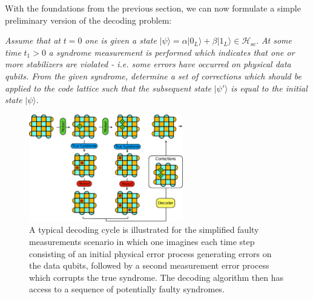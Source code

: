 \documentclass[twocolumn,preprintnumbers,amsmath,amssymb,notitlepage,nofootinbib,longbibliography,superscriptaddress,aps,pra,10pt]{revtex4-1}
\begin{document}
	With the foundations from the previous section, we can now formulate a simple preliminary version of the decoding problem: \newline

	\noindent\textit{Assume that at} $t=0$ \textit{one is given a state} $|\psi\rangle = \alpha |0_L\rangle + \beta |1_L\rangle \in \mathcal{H}_{\mathrm{sc}}.$
	\textit{At some time }$t_1>0$ \textit{a syndrome measurement is performed which indicates that one or more stabilizers are violated - i.e. some errors have occurred on physical data qubits.
	From the given syndrome, determine a set of corrections which should be applied to the code lattice such that the subsequent state} $|\psi'\rangle$
	\textit{is equal to the initial state} $|\psi\rangle.$ \newline

	\begin{figure}
		\centering
		\includegraphics[width=0.6\textwidth]{figures/decoding_problem.pdf}
		\caption{
			A typical decoding cycle is illustrated for the simplified faulty measurements scenario in which one imagines each time step consisting of an initial physical
			error process generating errors on the data qubits, followed by a second measurement error process which corrupts the true syndrome.
			The decoding algorithm then has access to a sequence of potentially faulty syndromes.
		}
		\label{f:decoding_problem}
	\end{figure}
\end{document}
